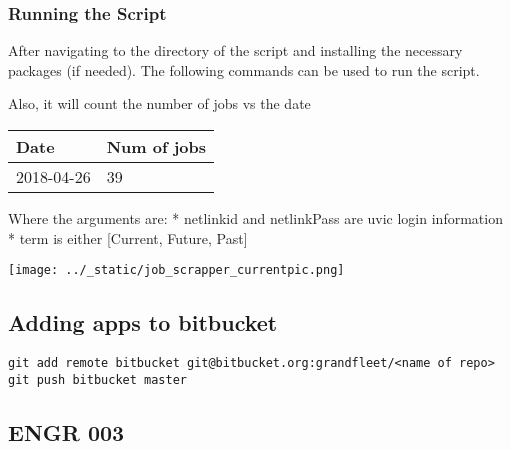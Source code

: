 \subsubsection{Running the Script}\label{running-the-script}

After navigating to the directory of the script and installing the
necessary packages (if needed). The following commands can be used to
run the script.

Also, it will count the number of jobs vs the date

\begin{longtable}[]{@{}ll@{}}
\toprule
\begin{minipage}[b]{0.20\columnwidth}\raggedright
Date\strut
\end{minipage} & \begin{minipage}[b]{0.21\columnwidth}\raggedright
Num of jobs\strut
\end{minipage}\tabularnewline
\midrule
\endhead
\begin{minipage}[t]{0.20\columnwidth}\raggedright
2018-04-26\strut
\end{minipage} & \begin{minipage}[t]{0.21\columnwidth}\raggedright
39\strut
\end{minipage}\tabularnewline
\bottomrule
\end{longtable}

\begin{Shaded}
\end{Shaded}

Where the arguments are: * netlinkid and netlinkPass are uvic login
information * term is either {[}Current, Future, Past{]}

\texttt{[image: ../\_static/job\_scrapper\_currentpic.png]}


\subsection{Adding apps to bitbucket}\label{adding-apps-to-bitbucket}

\begin{verbatim}
git add remote bitbucket git@bitbucket.org:grandfleet/<name of repo>
git push bitbucket master
\end{verbatim}


\subsection{ENGR 003} 

